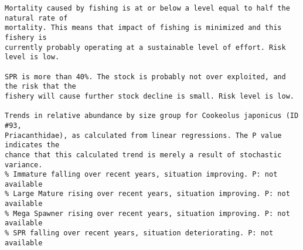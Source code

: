\documentclass{report}\usepackage[]{graphicx}\usepackage[]{color}
\makeatletter
\newenvironment{kframe}{%
 \def\at@end@of@kframe{}%
 \ifinner\ifhmode%
  \def\at@end@of@kframe{\end{minipage}}%
  \begin{minipage}{\columnwidth}%
 \fi\fi%
 \def\FrameCommand##1{\hskip\@totalleftmargin \hskip-\fboxsep
 \colorbox{shadecolor}{##1}\hskip-\fboxsep
     \hskip-\linewidth \hskip-\@totalleftmargin \hskip\columnwidth}%
 \MakeFramed {\advance\hsize-\width
   \@totalleftmargin\z@ \linewidth\hsize
   \@setminipage}}%
 {\par\unskip\endMakeFramed%
 \at@end@of@kframe}
\newenvironment{knitrout}{}{} %
\makeatother
\begin{document}
\begin{knitrout}
\begin{kframe}
\begin{verbatim}
Mortality caused by fishing is at or below a level equal to half the natural rate of
mortality. This means that impact of fishing is minimized and this fishery is
currently probably operating at a sustainable level of effort. Risk level is low.
 
SPR is more than 40%. The stock is probably not over exploited, and the risk that the
fishery will cause further stock decline is small. Risk level is low.
 
Trends in relative abundance by size group for Cookeolus japonicus (ID #93,
Priacanthidae), as calculated from linear regressions. The P value indicates the
chance that this calculated trend is merely a result of stochastic variance.
% Immature falling over recent years, situation improving. P: not available
% Large Mature rising over recent years, situation improving. P: not available
% Mega Spawner rising over recent years, situation improving. P: not available
% SPR falling over recent years, situation deteriorating. P: not available
\end{verbatim}
\end{kframe}
\end{knitrout}
\end{document}
